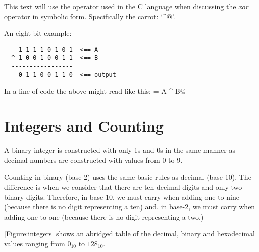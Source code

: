 This text will use the operator used in the C language when discussing
the {\em xor}  operator in symbolic form.  Specifically the carrot: `\verb@^@'.


An eight-bit example:

\begin{verbatim}
    1 1 1 1 0 1 0 1  <== A
  ^ 1 0 0 1 0 0 1 1  <== B
  -----------------
    0 1 1 0 0 1 1 0  <== output
\end{verbatim}

In a line of code the above might read like this: \verb@output = A ^ B@


\section{Integers and Counting}

A binary integer is constructed with only 1s and 0s in the same
manner as decimal numbers are constructed with values from 0 to 9.

Counting in binary (base-2) uses the same basic rules as decimal (base-10).  
The difference is when we consider that there are ten decimal digits and 
only two binary digits.  Therefore, in base-10, we must carry when adding one to 
nine (because there is no digit representing a ten) and, in base-2, we must 
carry when adding one to one (because there is no digit representing a two.)

\autoref{Figure:integers} shows an abridged table of the decimal, binary and 
hexadecimal values ranging from $0_{10}$ to $128_{10}$.

